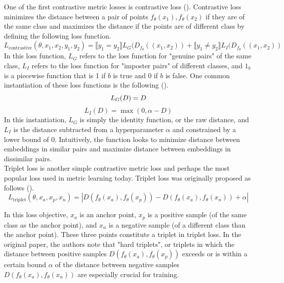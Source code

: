 \documentclass[./dissertation.tex]{subfiles}
\begin{document}
    One of the first contrastive metric losses is contrastive loss (\cite{chopra2005learning}). Contrastive loss minimizes the distance between a pair of points $f_{\theta}(x_{1}), f_{\theta}(x_{2})$ if they are of the same class and maximizes the distance if the points are of different class by defining the following loss function. \\ 
    \begin{equation*}         L_{\text{contrastive}}(\theta, x_{1}, x_{2}, y_{1}, y_{2})
            = \llbracket y_{1} = y_{2} \rrbracket       L_{G}(D_{f_{\theta}}((x_{1}, x_{2})) +
            \llbracket y_{1} \neq y_{2} \rrbracket
            L_{I}(D_{f_{\theta}}((x_{1}, x_{2}))
    \end{equation*}
    In this loss function, $L_{G}$ refers to the loss function for "genuine pairs" of the same class, $L_{I}$ refers to the loss function for "imposter pairs" of different classes, and $1_{b}$ is a piecewise function that is 1 if $b$ is true and 0 if $b$ is false. One common instantiation of these loss functions is the following (\cite{weng2021contrastive}).
    \begin{equation*}
            L_{G}(D) = D \\
    \end{equation*}  
        \begin{equation*}
            L_{I}(D) = \max(0, \alpha - D) 
    \end{equation*}  
    In this instantiation, $L_{G}$ is simply the identity function, or the raw distance, and $L_{I}$ is the distance subtracted from a hyperparameter $\alpha$ and constrained by a lower bound of 0. Intuitively, the function looks to minimize distance between embeddings in similar pairs and maximize distance between embeddings in dissimilar pairs. \\
    
    Triplet loss is another simple contrastive metric loss and perhaps the most popular loss used in metric learning today. Triplet loss was originally proposed as follows (\cite{schroff2015facenet}). 
    \begin{equation*}
    L_{\text{triplet}}(\theta, x_{a}, x_{p}, x_{n}) =
    |D(f_{\theta}(x_{a}), f_{\theta}(x_{p})) - D(f_{\theta}(x_{a}), f_{\theta}(x_{n})) + \alpha|
    \end{equation*} 
    
    In this loss objective, $x_{a}$ is an anchor point, $x_{p}$ is a positive sample (of the same class as the anchor point), and  $x_{n}$ is a negative sample (of a different class than the anchor point). These three points constitute a triplet in triplet loss. In the original paper, the authors note that "hard triplets", or triplets in which the distance between positive samples $D(f_{\theta}(x_{a}), f_{\theta}(x_{p}))$ exceeds or is within a certain bound $\alpha$ of the distance between negative samples $D(f_{\theta}(x_{a}), f_{\theta}(x_{n}))$ are especially crucial for training. \\
    
\end{document}
